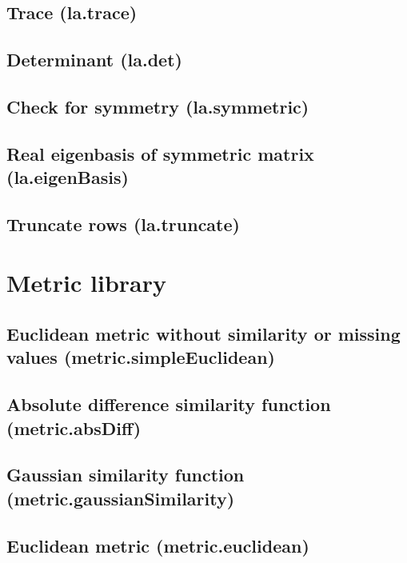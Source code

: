 \documentclass{article}
\theoremstyle{definition}
\begin{document}
\subsection{Trace (la.trace)}

\subsection{Determinant (la.det)}

\subsection{Check for symmetry (la.symmetric)}

\subsection{Real eigenbasis of symmetric matrix (la.eigenBasis)}

\subsection{Truncate rows (la.truncate)}

\pagebreak

\section{Metric library}

\subsection{Euclidean metric without similarity or missing values (metric.simpleEuclidean)}

\subsection{Absolute difference similarity function (metric.absDiff)}

\subsection{Gaussian similarity function (metric.gaussianSimilarity)}

\subsection{Euclidean metric (metric.euclidean)}
\end{document}
